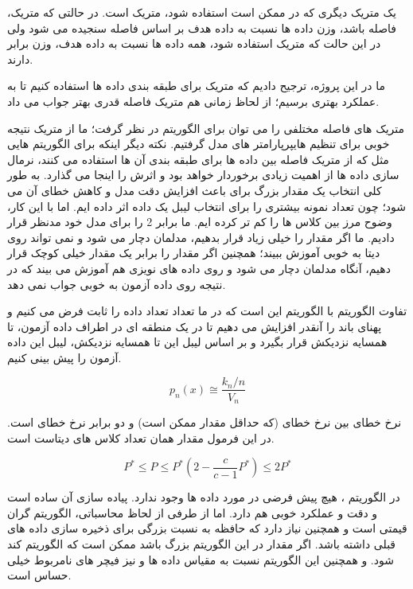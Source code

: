 \documentclass[12pt,onecolumn,a4paper]{article}
\begin{document}
یک متریک دیگری که در  ممکن است استفاده شود، متریک  است. در حالتی که متریک، فاصله باشد، وزن داده ها نسبت به داده هدف بر اساس فاصله سنجیده می شود ولی در این حالت که متریک  استفاده شود، همه داده ها نسبت به داده هدف، وزن برابر دارند. 

ما در این پروژه، ترجیح دادیم که متریک  برای طبقه بندی داده ها استفاده کنیم تا به عملکرد بهتری برسیم؛ از لحاظ زمانی هم متریک فاصله قدری بهتر جواب می داد.

متریک های فاصله مختلفی را می توان برای الگوریتم  در نظر گرفت؛ ما از متریک  نتیجه خوبی برای تنظیم هایپرپارامتر های مدل گرفتیم. نکته دیگر اینکه برای الگوریتم هایی مثل  که از متریک فاصله بین داده ها برای طبقه بندی آن ها استفاده می کنند، نرمال سازی داده ها از اهمیت زیادی برخوردار خواهد بود و اثرش را اینجا می گذارد.
به طور کلی انتخاب یک مقدار بزرگ برای  باعث افزایش دقت مدل و کاهش خطای آن می شود؛ چون تعداد نمونه بیشتری را برای انتخاب لیبل یک داده اثر داده ایم. اما با این کار، وضوح مرز بین کلاس ها را کم تر کرده ایم. ما  برابر 2 را برای مدل خود مدنظر قرار دادیم.
ما اگر مقدار  را خیلی زیاد قرار بدهیم، مدلمان دچار  می شود و نمی تواند روی دیتا به خوبی آموزش ببیند؛ همچنین اگر مقدار  را برابر یک مقدار خیلی کوچک قرار دهیم، آنگاه مدلمان دچار  می شود و روی داده های نویزی هم آموزش می بیند که در نتیجه روی داده آزمون به خوبی جواب نمی دهد.

تفاوت الگوریتم  با الگوریتم  این است که در  ما تعداد  تعداد داده را ثابت فرض می کنیم و پهنای باند را آنقدر افزایش می دهیم تا در یک منطقه ای در اطراف داده آزمون،  تا همسایه نزدیکش قرار بگیرد و بر اساس لیبل این  تا همسایه نزدیکش، لیبل این داده آزمون را پیش بینی کنیم.

\begin{equation}
    p_n(x) \cong \frac{k_n/n}{V_n}
\end{equation}

نرخ خطای  بین نرخ خطای  (که حداقل مقدار ممکن است) و دو برابر نرخ خطای  است. در این فرمول مقدار  همان تعداد کلاس های دیتاست است.

\begin{equation}
    P^* \leq P \leq P^*(2-\frac{c}{c-1}P^*) \leq 2P^*
\end{equation}

در الگوریتم ، هیچ پیش فرضی در مورد داده ها وجود ندارد. پیاده سازی آن ساده است و دقت و عملکرد خوبی هم دارد. اما از طرفی از لحاظ محاسباتی، الگوریتم گران قیمتی است و همچنین نیاز دارد که حافظه به نسبت بزرگی برای ذخیره سازی داده های قبلی داشته باشد. اگر مقدار  در این الگوریتم بزرگ باشد ممکن است که الگوریتم کند شود. و همچنین این الگوریتم نسبت به مقیاس داده ها و نیز فیچر های نامربوط خیلی حساس است.
\end{document}
